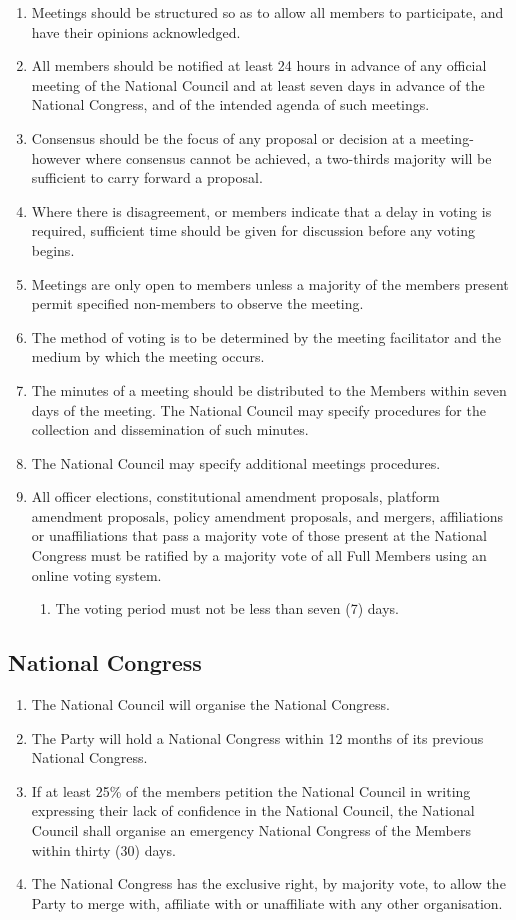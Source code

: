 \documentclass[a4paper,titlepage,8.5pt]{article}
\begin{document}
\begin{enumerate}
\item Meetings should be structured so as to allow all members to participate, and have their opinions acknowledged.
\item All members should be notified at least 24 hours in advance of any official meeting of the National Council and at least seven days in advance of the National Congress, and of the intended agenda of such meetings.
\item Consensus should be the focus of any proposal or decision at a meeting- however where consensus cannot be achieved, a two-thirds majority will be sufficient to carry forward a proposal.
\item Where there is disagreement, or members indicate that a delay in voting is required, sufficient time should be given for discussion before any voting begins.
\item Meetings are only open to members unless a majority of the members present permit specified non-members to observe the meeting.  
\item The method of voting is to be determined by the meeting facilitator and the medium by which the meeting occurs.
\item The minutes of a meeting should be distributed to the Members within seven days of the meeting. The National Council may specify procedures for the collection and dissemination of such minutes.
\item The National Council may specify additional meetings procedures.
\item All officer elections, constitutional amendment proposals, platform amendment proposals, policy amendment proposals, and mergers, affiliations or unaffiliations that pass a majority vote of those present at the National Congress must be ratified by a majority vote of all Full Members using an online voting system.
\begin{enumerate}
\item The voting period must not be less than seven (7) days.
\end{enumerate}
\end{enumerate}

\subsection{National Congress}

\begin{enumerate}
\item The National Council will organise the National Congress.
\item The Party will hold a National Congress within 12 months of its previous National Congress.
\item If at least 25\% of the members petition the National Council in writing expressing their lack of confidence in the National Council, the National Council shall organise an emergency National Congress of the Members within thirty (30) days.
\item The National Congress has the exclusive right, by majority vote, to allow the Party to merge with, affiliate with or unaffiliate with any other organisation.
\end{enumerate}
\end{document}

